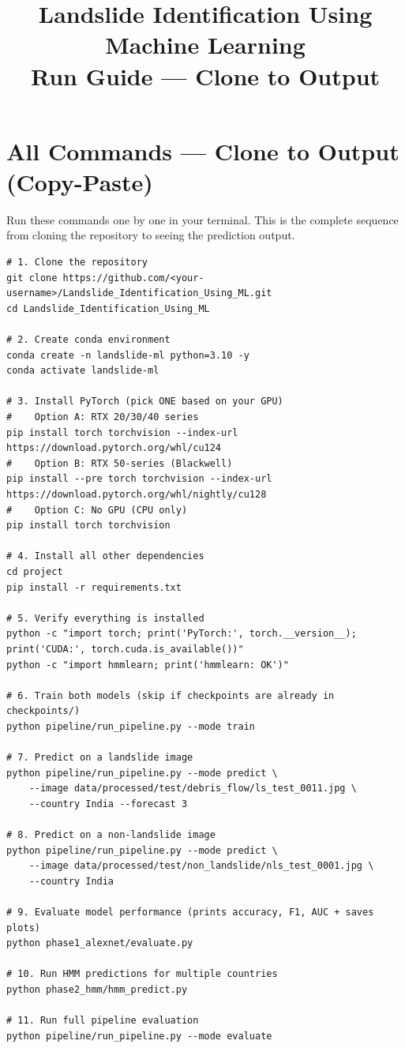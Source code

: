 \documentclass[11pt]{article}
\title{Landslide Identification Using Machine Learning \\ \large Run Guide --- Clone to Output}
\author{}
\date{}
\begin{document}
\maketitle
\tableofcontents
\newpage

\section{All Commands --- Clone to Output (Copy-Paste)}

Run these commands one by one in your terminal. This is the complete sequence from cloning the repository to seeing the prediction output.

\begin{verbatim}
# 1. Clone the repository
git clone https://github.com/<your-username>/Landslide_Identification_Using_ML.git
cd Landslide_Identification_Using_ML

# 2. Create conda environment
conda create -n landslide-ml python=3.10 -y
conda activate landslide-ml

# 3. Install PyTorch (pick ONE based on your GPU)
#    Option A: RTX 20/30/40 series
pip install torch torchvision --index-url https://download.pytorch.org/whl/cu124
#    Option B: RTX 50-series (Blackwell)
pip install --pre torch torchvision --index-url https://download.pytorch.org/whl/nightly/cu128
#    Option C: No GPU (CPU only)
pip install torch torchvision

# 4. Install all other dependencies
cd project
pip install -r requirements.txt

# 5. Verify everything is installed
python -c "import torch; print('PyTorch:', torch.__version__); print('CUDA:', torch.cuda.is_available())"
python -c "import hmmlearn; print('hmmlearn: OK')"

# 6. Train both models (skip if checkpoints are already in checkpoints/)
python pipeline/run_pipeline.py --mode train

# 7. Predict on a landslide image
python pipeline/run_pipeline.py --mode predict \
    --image data/processed/test/debris_flow/ls_test_0011.jpg \
    --country India --forecast 3

# 8. Predict on a non-landslide image
python pipeline/run_pipeline.py --mode predict \
    --image data/processed/test/non_landslide/nls_test_0001.jpg \
    --country India

# 9. Evaluate model performance (prints accuracy, F1, AUC + saves plots)
python phase1_alexnet/evaluate.py

# 10. Run HMM predictions for multiple countries
python phase2_hmm/hmm_predict.py

# 11. Run full pipeline evaluation
python pipeline/run_pipeline.py --mode evaluate
\end{verbatim}
\end{document}

